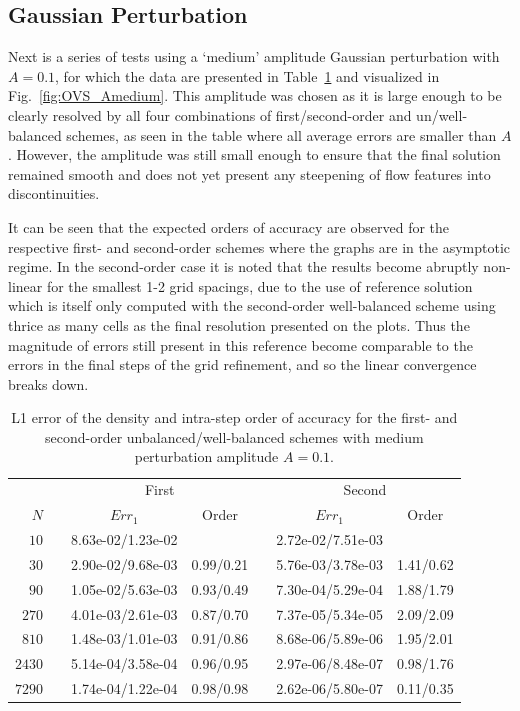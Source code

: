 \subsection{Gaussian Perturbation}

Next is a series of tests using a `medium' amplitude Gaussian perturbation with $A=0.1$, for which the data are presented in Table~\ref{table:OVS_Amedium} and visualized in Fig.~\ref{fig:OVS_Amedium}. This amplitude was chosen as it is large enough to be clearly resolved by all four combinations of first/second-order and un/well-balanced schemes, as seen in the table where all average errors are smaller than $A$. However, the amplitude was still small enough to ensure that the final solution remained smooth and does not yet present any steepening of flow features into discontinuities.

It can be seen that the expected orders of accuracy are observed for the respective first- and second-order schemes where the graphs are in the asymptotic regime. In the second-order case it is noted that the results become abruptly non-linear for the smallest 1-2 grid spacings, due to the use of reference solution which is itself only computed with the second-order well-balanced scheme using thrice as many cells as the final resolution presented on the plots. Thus the magnitude of errors still present in this reference become comparable to the errors in the final steps of the grid refinement, and so the linear convergence breaks down.

\begin{table}\centering
\caption{L1 error of the density and intra-step order of accuracy for the first- and second-order unbalanced/well-balanced schemes with medium perturbation amplitude $A=0.1$.}
\label{table:OVS_Amedium}
\begin{tabular}{@{}rcccccc@{}}\toprule
& \phantom{a} & \multicolumn{2}{c}{First} & \phantom{ab} & \multicolumn{2}{c}{Second}\\
\cmidrule{3-4} \cmidrule{6-7}
$N$ && $Err_1$ & Order && $Err_1$ & Order\\ \midrule
$10$ && 8.63e-02/1.23e-02 &&& 2.72e-02/7.51e-03 &\\
$30$ && 2.90e-02/9.68e-03 & 0.99/0.21 && 5.76e-03/3.78e-03 & 1.41/0.62\\
$90$ && 1.05e-02/5.63e-03 & 0.93/0.49 && 7.30e-04/5.29e-04 & 1.88/1.79\\
$270$ && 4.01e-03/2.61e-03 & 0.87/0.70 && 7.37e-05/5.34e-05 & 2.09/2.09\\
$810$ && 1.48e-03/1.01e-03 & 0.91/0.86 && 8.68e-06/5.89e-06 & 1.95/2.01\\
$2430$ && 5.14e-04/3.58e-04 & 0.96/0.95 && 2.97e-06/8.48e-07 & 0.98/1.76\\
$7290$ && 1.74e-04/1.22e-04 & 0.98/0.98 && 2.62e-06/5.80e-07 & 0.11/0.35\\
\bottomrule
\end{tabular}
\end{table}


